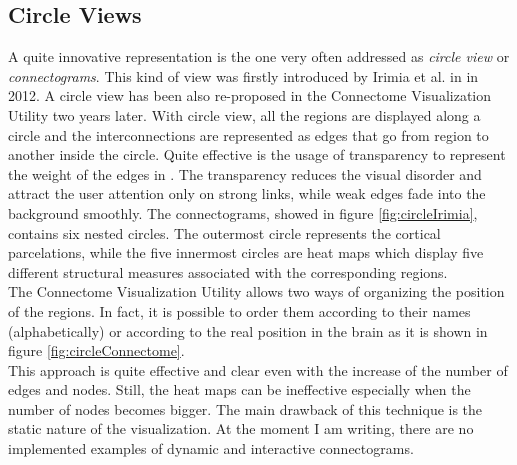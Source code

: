 \documentclass{article}
\begin{document}
\begin{multicols}{2}
\subsection{Circle Views}
\label{subsec:circleviews}
A quite innovative representation is the one very often addressed as \textit{circle view} or \textit{connectograms}. This kind of view was firstly introduced by Irimia et al. in \cite{irimia2012patient} in 2012. A circle view has been also re-proposed in the Connectome Visualization Utility \cite{connectomeVisualizationUtility} two years later.
With circle view, all the regions are displayed along a circle and the interconnections are represented as edges that go from region to another inside the circle. Quite effective is the usage of transparency to represent the weight of the edges in \cite{irimia2012patient}. The transparency reduces the visual disorder and attract the user attention only on strong links, while weak edges fade into the background smoothly. The connectograms, showed in figure \ref{fig:circleIrimia}, contains six nested circles. The outermost circle represents the cortical parcelations, while the five innermost circles are heat maps which display five different structural measures associated with the corresponding regions.\\
The Connectome Visualization Utility allows two ways of organizing the position of the regions. In fact, it is possible to order them according to their names (alphabetically) or according to the real position in the brain as it is shown in figure \ref{fig:circleConnectome}. \\
This approach is quite effective and clear even with the increase of the number of edges and nodes. Still, the heat maps can be ineffective especially when the number of nodes becomes bigger. The main drawback of this technique is the static nature of the visualization. At the moment I am writing, there are no implemented examples of dynamic and interactive connectograms.







\end{multicols}
\end{document}
